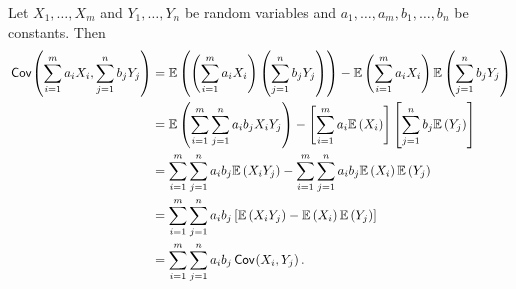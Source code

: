 \begin{ex}
  Let $X_1,\ldots, X_m$ and $Y_1,\ldots,Y_n$ be random variables and
  $a_1,\ldots,a_m,b_1,\ldots,b_n$ be constants. Then
  \begin{align*}
    \,\textsf{Cov}\mkern-2mu\left(\sum_{i=1}^m a_iX_i, \sum_{j=1}^nb_jY_j  \right)
     & =\mathbb{E}\left(\left(\sum_{i=1}^m a_iX_i\right)\left(\sum_{j=1}^nb_jY_j\right)\right)
    -\mathbb{E}\left(\sum_{i=1}^m a_iX_i\right)\mathbb{E}\left(\sum_{j=1}^nb_jY_j\right)                             \\
     & =\mathbb{E}\left(\sum_{i=1}^m \sum_{j=1}^n a_ib_jX_iY_j\right)
    -\left[\sum_{i=1}^m a_i\mathbb{E}\left(X_i\right)\right] \left[\sum_{j=1}^n b_j\mathbb{E}\left(Y_j\right)\right] \\
     & =\sum_{i=1}^m\sum_{j=1}^n a_ib_j \mathbb{E}\left(X_iY_j\right)
    -\sum_{i=1}^m\sum_{j=1}^n a_ib_j \mathbb{E}\left(X_i\right)\mathbb{E}\left(Y_j\right)                            \\
     & =\sum_{i=1}^m\sum_{j=1}^n a_ib_j\left[\mathbb{E}\left(X_iY_j\right)-\mathbb{E}\left(X_i\right)\mathbb{E}\left(Y_j\right)\right]  \\
     & =\sum_{i=1}^m\sum_{j=1}^n a_ib_j\,\textsf{Cov}\mkern-2mu\left(X_i, Y_j \right).
  \end{align*}
\end{ex}

